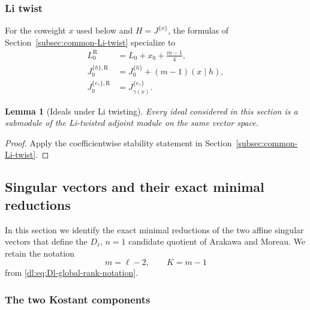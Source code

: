 \documentclass[11pt,reqno]{amsart}
\newtheorem{lemma}[theorem]{Lemma}
\theoremstyle{definition}
\theoremstyle{remark}
\begin{document}
\subsubsection{Li twist}

For the coweight $x$ used below and $H=J^{\{x\}}$, the formulas of
Section~\ref{subsec:common-Li-twist} specialize to
\begin{align}
 L_0^{\mathrm R}&=L_0+x_0+\frac{m-1}{4},
 \label{dl:eq:Dl-Li-Ramond-Hamiltonian}\\
 J_0^{\{h\},\mathrm R}&=J_0^{\{h\}}+(m-1)(x\mid h),
 \label{dl:eq:Dl-Li-Cartan-shift}\\
 J_0^{\{e_\gamma\},\mathrm R}&=J_{\gamma(x)}^{\{e_\gamma\}}.
 \label{dl:eq:Dl-Li-root-mode-shift}
\end{align}
\begin{lemma}[Ideals under Li twisting]

Every ideal considered in this section is a submodule of the Li-twisted
adjoint module on the same vector space.
\end{lemma}
\begin{proof}
Apply the coefficientwise stability statement in
Section~\ref{subsec:common-Li-twist}.
\end{proof}

\subsection{Singular vectors and their exact minimal reductions}
\label{dl:sec:Dl-singular-vectors-exact-reductions}

In this section we identify the exact minimal reductions of the two
affine singular vectors that define the \(D_\ell\), \(n=1\) candidate
quotient of Arakawa and Moreau.  We retain the notation
\[
  m=\ell-2,
  \qquad
  K=m-1
\]
from \eqref{dl:eq:Dl-global-rank-notation}.

\subsubsection{The two Kostant components}
\end{document}

